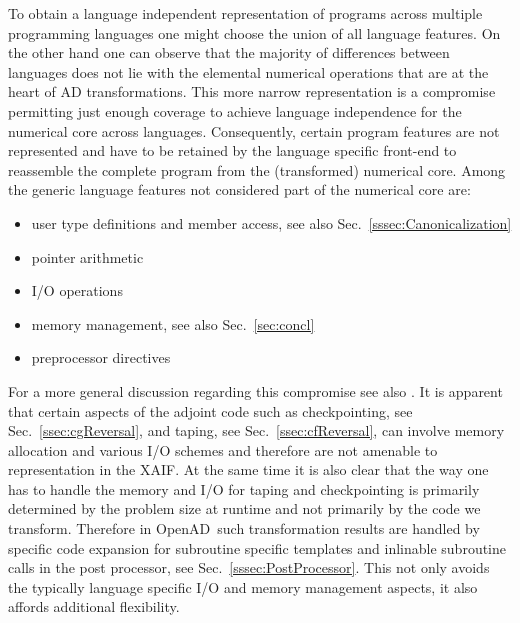 \documentclass[11pt]{article}
\newcommand{\OpenAD}{OpenAD}
\newcommand{\xaif}{XAIF}
\newcommand{\refsec}[1]{{Sec.~\ref{#1}}}
\begin{document}
To obtain a language independent representation of programs across multiple 
programming languages one might choose the union of all language features. 
On the other hand one can observe that the majority of differences between 
languages does not lie with the elemental numerical operations that are at the 
heart of AD transformations. This more narrow representation 
is a compromise permitting just enough coverage to achieve language 
independence for the numerical core across languages.
Consequently, certain program features are not represented and have 
to be retained by the language specific front-end to reassemble the 
complete program from the (transformed) numerical core.
Among the generic language features not considered part of the numerical core are: 
\begin{itemize}
  \parskip = -2pt
\item user type definitions and member access, see also \refsec{sssec:Canonicalization}
\item pointer arithmetic
\item I/O operations  
\item memory management, see also \refsec{sec:concl}
\item preprocessor directives
\end{itemize}
For a more general discussion regarding this compromise see also \cite{sea2000something}.
It is apparent that certain aspects of the adjoint code such as 
checkpointing, see \refsec{ssec:cgReversal}, and taping, see \refsec{ssec:cfReversal},
can involve memory allocation and various I/O schemes and therefore 
are not amenable to representation in the \xaif. 
At the same time it is also clear that the way  one has to handle the memory and I/O for 
taping and checkpointing is primarily determined by the problem size at runtime and not
primarily by the code we transform.   
Therefore in \OpenAD\ such transformation results are handled by  specific 
code expansion for subroutine specific templates and inlinable subroutine calls 
in the post processor, see \refsec{sssec:PostProcessor}. This not only avoids 
the typically language specific I/O and memory management aspects, it also 
affords additional flexibility.   
\end{document}
